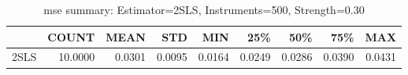 \begin{table}[ht]
\centering
\caption{mse summary: Estimator=2SLS, Instruments=500, Strength=0.30}
\begin{tabular}{lrrrrrrrr}
\toprule
 & COUNT & MEAN & STD & MIN & 25\% & 50\% & 75\% & MAX \\
\midrule
2SLS & 10.0000 & 0.0301 & 0.0095 & 0.0164 & 0.0249 & 0.0286 & 0.0390 & 0.0431 \\
\bottomrule
\end{tabular}
\end{table}
